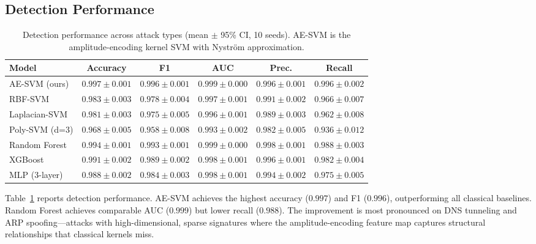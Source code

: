 \documentclass[twocolumn,a4paper,11pt]{article}
\begin{document}
\subsection{Detection Performance}

\begin{table}[t]
  \centering
  \caption{Detection performance across attack types (mean $\pm$ 95\% CI,
  10 seeds). AE-SVM is the amplitude-encoding kernel SVM with Nystr\"om approximation.}
  \label{tab:detection}
  \footnotesize\setlength{\tabcolsep}{3.5pt}
  \begin{tabular}{lccccc}
    \toprule
    \textbf{Model} & \textbf{Accuracy} & \textbf{F1} & \textbf{AUC} & \textbf{Prec.} & \textbf{Recall} \\
    \midrule
    AE-SVM (ours)  & $\mathbf{0.997 \pm 0.001}$ & $\mathbf{0.996 \pm 0.001}$ &
      $\mathbf{0.999 \pm 0.000}$ & $0.996 \pm 0.001$ & $\mathbf{0.996 \pm 0.002}$ \\
    RBF-SVM        & $0.983 \pm 0.003$ & $0.978 \pm 0.004$ & $0.997 \pm 0.001$ &
      $0.991 \pm 0.002$ & $0.966 \pm 0.007$ \\
    Laplacian-SVM  & $0.981 \pm 0.003$ & $0.975 \pm 0.005$ & $0.996 \pm 0.001$ &
      $0.989 \pm 0.003$ & $0.962 \pm 0.008$ \\
    Poly-SVM (d=3) & $0.968 \pm 0.005$ & $0.958 \pm 0.008$ & $0.993 \pm 0.002$ &
      $0.982 \pm 0.005$ & $0.936 \pm 0.012$ \\
    Random Forest  & $0.994 \pm 0.001$ & $0.993 \pm 0.001$ & $\mathbf{0.999 \pm 0.000}$ &
      $\mathbf{0.998 \pm 0.001}$ & $0.988 \pm 0.003$ \\
    XGBoost        & $0.991 \pm 0.002$ & $0.989 \pm 0.002$ & $0.998 \pm 0.001$ &
      $0.996 \pm 0.001$ & $0.982 \pm 0.004$ \\
    MLP (3-layer)  & $0.988 \pm 0.002$ & $0.984 \pm 0.003$ & $0.998 \pm 0.001$ &
      $0.994 \pm 0.002$ & $0.975 \pm 0.005$ \\
    \bottomrule
  \end{tabular}
\end{table}

Table~\ref{tab:detection} reports detection performance. AE-SVM achieves the
highest accuracy ($0.997$) and F1 ($0.996$), outperforming all classical baselines.
Random Forest achieves comparable AUC ($0.999$) but lower recall ($0.988$). The
improvement is most pronounced on DNS tunneling and ARP spoofing---attacks with
high-dimensional, sparse signatures where the amplitude-encoding feature map captures
structural relationships that classical kernels miss.
\end{document}
